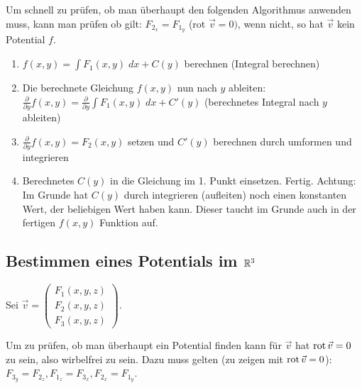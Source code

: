 Um schnell zu prüfen, ob man überhaupt den folgenden Algorithmus anwenden muss,
kann man prüfen ob gilt: $F_{2_x} = F_{1_y}$ (rot $\vec{v} = 0)$, wenn nicht, so hat $\vec{v}$ kein Potential $f$.

\begin{enumerate}[itemsep=1em]
	\item $f(x,y) = \int F_1(x,y)\;dx + C(y)$ berechnen (Integral berechnen)
	\item Die berechnete Gleichung $f(x,y)$ nun nach $y$ ableiten:
	$\frac{\partial}{\partial y} f(x,y) = \frac{\partial}{\partial y}\int F_1(x,y)\;dx + C'(y)$
	(berechnetes Integral nach $y$ ableiten)
	\item $\frac{\partial}{\partial y} f(x,y) = F_2(x,y)$ setzen und $C'(y)$ berechnen durch umformen
	und integrieren
	\item Berechnetes $C(y)$ in die Gleichung im 1. Punkt einsetzen. Fertig. Achtung: Im Grunde hat
	$C(y)$ durch integrieren (aufleiten) noch einen konstanten Wert, der beliebigen Wert haben kann.
	Dieser taucht im Grunde auch in der fertigen $f(x,y)$ Funktion auf.
\end{enumerate}

\subsection{Bestimmen eines Potentials im $\mathbb{R}^3$}
Sei $\vec{v} = \begin{pmatrix}
F_1(x,y,z)\\
F_2(x,y,z)\\
F_3(x,y,z)
\end{pmatrix}$.

Um zu prüfen, ob man überhaupt ein Potential finden kann für $\vec{v}$ hat $\operatorname{rot} \vec{v} = 0$
zu sein, also wirbelfrei zu sein. Dazu muss gelten (zu zeigen mit $\operatorname{rot} \vec{v} = 0$): 
$F_{3_y} = F_{2_z}, F_{1_z} = F_{3_x}, F_{2_x} = F_{1_y}$.

